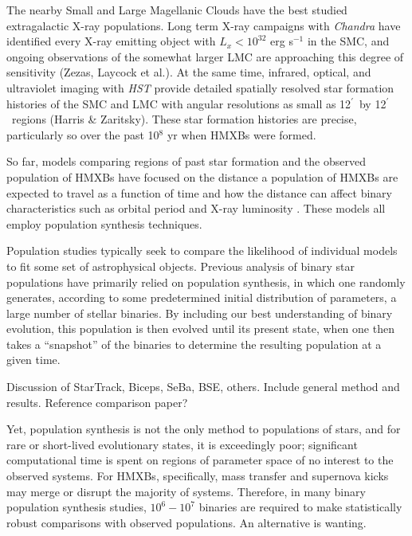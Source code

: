\documentclass[12pt, preprint]{aastex}
\newcommand{\amin}{\ifmmode {^{\prime}\ }\else$^{\prime}$\fi}
\begin{document}
The nearby Small and Large Magellanic Clouds have the best studied extragalactic X-ray populations. Long term X-ray campaigns with {\it Chandra} have identified every X-ray emitting object with $L_x < 10^{32}$ erg s$^{-1}$ in the SMC, and ongoing observations of the somewhat larger LMC are approaching this degree of sensitivity (Zezas, Laycock et al.). At the same time, infrared, optical, and ultraviolet imaging with {\it HST} provide detailed spatially resolved star formation histories of the SMC and LMC with angular resolutions as small as 12\amin\ by 12\amin\ regions (Harris \& Zaritsky). These star formation histories are precise, particularly so over the past 10$^8$ yr when HMXBs were formed.


So far, models comparing regions of past star formation and the observed population of HMXBs have focused on the distance a population of HMXBs are expected to travel as a function of time \citep{sepinsky05} and how the distance can affect binary characteristics such as orbital period and X-ray luminosity \citep{zuo10, zuo15}. These models all employ population synthesis techniques.


Population studies typically seek to compare the likelihood of individual models to fit some set of astrophysical objects. Previous analysis of binary star populations have primarily relied on population synthesis, in which one randomly generates, according to some predetermined initial distribution of parameters, a large number of stellar binaries. By including our best understanding of binary evolution, this population is then evolved until its present state, when one then takes a ``snapshot'' of the binaries to determine the resulting population at a given time. %


Discussion of StarTrack, Biceps, SeBa, BSE, others. Include general method and results. Reference comparison paper?


Yet, population synthesis is not the only method to populations of stars, and for rare or short-lived evolutionary states, it is exceedingly poor; significant computational time is spent on regions of parameter space of no interest to the observed systems. For HMXBs, specifically, mass transfer and supernova kicks may merge or disrupt the majority of systems. Therefore, in many binary population synthesis studies, $10^6-10^7$ binaries are required to make statistically robust comparisons with observed populations. An alternative is wanting.
\end{document}

